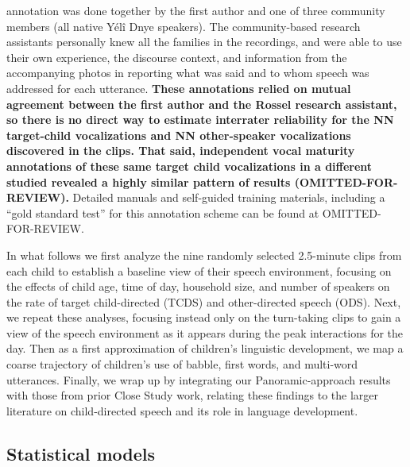 \documentclass[,man,floatsintext]{apa6}
\begin{document}
annotation was done together by the first author and one of three
community members (all native Yélî Dnye speakers). The community-based
research assistants personally knew all the families in the recordings,
and were able to use their own experience, the discourse context, and
information from the accompanying photos in reporting what was said and
to whom speech was addressed for each utterance. \textbf{These
annotations relied on mutual agreement between the first author and the
Rossel research assistant, so there is no direct way to estimate
interrater reliability for the NN target-child vocalizations and NN
other-speaker vocalizations discovered in the clips. That said,
independent vocal maturity annotations of these same target child
vocalizations in a different studied revealed a highly similar pattern
of results (OMITTED-FOR-REVIEW).} Detailed manuals and self-guided
training materials, including a \enquote{gold standard test} for this
annotation scheme can be found at OMITTED-FOR-REVIEW.

In what follows we first analyze the nine randomly selected 2.5-minute
clips from each child to establish a baseline view of their speech
environment, focusing on the effects of child age, time of day,
household size, and number of speakers on the rate of target
child-directed (TCDS) and other-directed speech (ODS). Next, we repeat
these analyses, focusing instead only on the turn-taking clips to gain a
view of the speech environment as it appears during the peak
interactions for the day. Then as a first approximation of children's
linguistic development, we map a coarse trajectory of children's use of
babble, first words, and multi-word utterances. Finally, we wrap up by
integrating our Panoramic-approach results with those from prior Close
Study work, relating these findings to the larger literature on
child-directed speech and its role in language development.

\subsection{Statistical models}\label{statistical-models}
\end{document}
